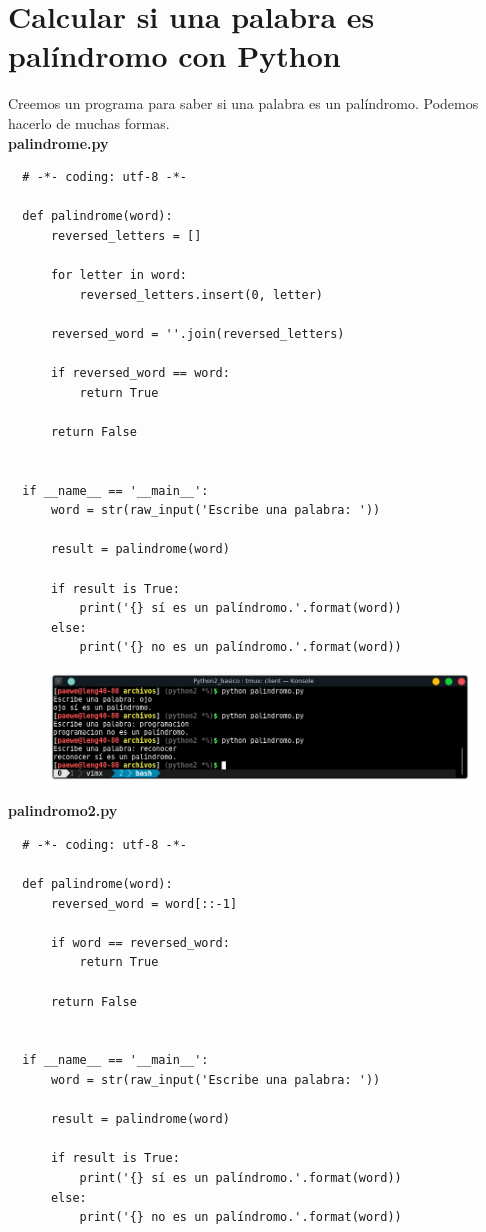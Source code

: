 \documentclass{article}
\begin{document}
\section{Calcular si una palabra es palíndromo con Python}%
Creemos un programa para saber si una palabra es un palíndromo. Podemos hacerlo
de muchas formas.\\

\textbf{palindrome.py}
\begin{verbatim}
  # -*- coding: utf-8 -*-

  def palindrome(word):
      reversed_letters = []

      for letter in word:
          reversed_letters.insert(0, letter)

      reversed_word = ''.join(reversed_letters)

      if reversed_word == word:
          return True

      return False


  if __name__ == '__main__':
      word = str(raw_input('Escribe una palabra: '))

      result = palindrome(word)

      if result is True:
          print('{} sí es un palíndromo.'.format(word))
      else:
          print('{} no es un palíndromo.'.format(word))
\end{verbatim}

\begin{figure}[h!]
  \centering
  \includegraphics[scale=0.75]{./Pictures/031_palindromo.png}
\end{figure}

\textbf{palindromo2.py}
\begin{verbatim}
  # -*- coding: utf-8 -*-

  def palindrome(word):
      reversed_word = word[::-1]

      if word == reversed_word:
          return True

      return False


  if __name__ == '__main__':
      word = str(raw_input('Escribe una palabra: '))

      result = palindrome(word)

      if result is True:
          print('{} sí es un palíndromo.'.format(word))
      else:
          print('{} no es un palíndromo.'.format(word))
\end{verbatim}
\end{document}
